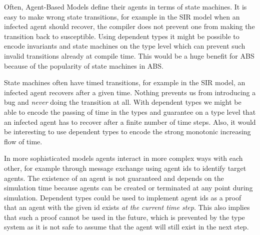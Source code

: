 Often, Agent-Based Models define their agents in terms of state machines. It is easy to make wrong state transitions, for example in the SIR model when an infected agent should recover, the compiler does not prevent one from making the transition back to susceptible. Using dependent types it might be possible to encode invariants and state machines on the type level which can prevent such invalid transitions already at compile time. This would be a huge benefit for ABS because of the popularity of state machines in ABS.

State machines often have timed transitions, for example in the SIR model, an infected agent recovers after a given time. Nothing prevents us from introducing a bug and \textit{never} doing the transition at all. With dependent types we might be able to encode the passing of time in the types and guarantee on a type level that an infected agent has to recover after a finite number of time steps. Also, it would be interesting to use dependent types to encode the strong monotonic increasing flow of time.
	
In more sophisticated models agents interact in more complex ways with each other, for example through message exchange using agent ids to identify target agents. The existence of an agent is not guaranteed and depends on the simulation time because agents can be created or terminated at any point during simulation. Dependent types could be used to implement agent ids as a proof that an agent with the given id exists \textit{at the current time step}. This also implies that such a proof cannot be used in the future, which is prevented by the type system as it is not safe to assume that the agent will still exist in the next step. %



